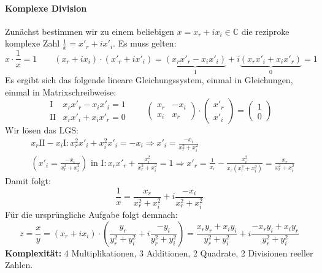 \documentclass[10pt,fleqn]{article}
\theoremstyle{definition}
\theoremstyle{remark}
\begin{document}
\paragraph{Komplexe Division} Zunächst bestimmen wir zu einem beliebigen \(x = x_r + ix_i \in \mathbb{C}\) die reziproke komplexe Zahl \(\frac{1}{x} = x'_r + ix'_i\). Es muss gelten:
\[
    x \cdot \frac{1}{x} = 1 \qquad (x_r + ix_i) \cdot (x'_r+ix'_i) = \underbrace{(x_rx'_r-x_ix'_i)}_1 + i\underbrace{(x_rx'_i+x_ix'_r)}_0 = 1
\]
Es ergibt sich das folgende lineare Gleichungssystem, einmal in Gleichungen, einmal in Matrixschreibweise:
\[
    \begin{array}{lc}
        \text{I}  & x_rx'_r-x_ix'_i = 1\\
        \text{II} & x_rx'_i+x_ix'_r = 0
    \end{array} \qquad \begin{pmatrix}
        x_r & -x_i\\
        x_i & x_r
    \end{pmatrix} \cdot \begin{pmatrix}
        x'_r\\
        x'_i
    \end{pmatrix} = \begin{pmatrix}
        1\\
        0
    \end{pmatrix}
\]
Wir lösen das LGS:
\begin{align*}
    &x_r\text{II} - x_i\text{I}\colon x_r^2x'_i + x_i^2x'_i = -x_i \Rightarrow x'_i = \frac{-x_i}{x_r^2+x_i^2}\\
    &\left(x'_i = \frac{-x_i}{x_r^2+x_i^2}\right)\text{ in I}\colon x_rx'_r + \frac{x_i^2}{x_r^2+x_i^2} = 1 \Rightarrow x'_r = \frac{1}{x_r} - \frac{x_i^2}{x_r(x_r^2+x_i^2)} = \frac{x_r}{x_r^2+x_i^2}
\end{align*}
Damit folgt:
\[
    \frac{1}{x} = \frac{x_r}{x_r^2+x_i^2} + i \frac{-x_i}{x_r^2+x_i^2}
\]
Für die ursprüngliche Aufgabe folgt demnach:
\[
    z = \frac{x}{y} = (x_r+ix_i) \cdot \left(\frac{y_r}{y_r^2+y_i^2} + i \frac{-y_i}{y_r^2+y_i^2}\right) = \frac{x_ry_r+x_iy_i}{y_r^2+y_i^2} + i \frac{-x_ry_i + x_iy_r}{y_r^2+y_i^2}
\]
\textbf{Komplexität:} 4 Multiplikationen, 3 Additionen, 2 Quadrate, 2 Divisionen reeller Zahlen.
\end{document}
